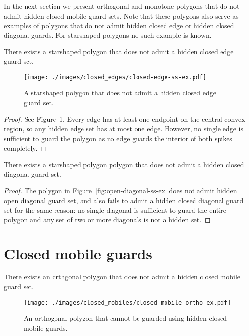 \documentclass{cccg12}
\begin{document}
In the next section we present orthogonal and monotone polygons that do not admit hidden closed mobile guard sets.
Note that these polygons also serve as examples of polygons that do not admit hidden closed edge or hidden closed diagonal guards.
For starshaped polygons no such example is known.

\begin{lemma}
There exists a starshaped polygon that does not admit a hidden closed edge guard set.
\end{lemma}

\begin{figure}[ht]
\centering
\texttt{[image: ./images/closed\_edges/closed-edge-ss-ex.pdf]}
\caption{A starshaped polygon that does not admit a hidden closed edge guard set.}
\label{fig:closed-edge-ss-ex}
\end{figure}

\begin{proof}
See Figure~\ref{fig:closed-edge-ss-ex}.
Every edge has at least one endpoint on the central convex region, so any hidden edge set has at most one edge.
However, no single edge is sufficient to guard the polygon as no edge guards the interior of both spikes completely.
\end{proof}

\begin{lemma}
There exists a starshaped polygon polygon that does not admit a hidden closed diagonal guard set.
\end{lemma}

\begin{proof}
The polygon in Figure~\ref{fig:open-diagonal-ss-ex} does not admit hidden open diagonal guard set, and also fails to admit a hidden closed diagonal guard set for the same reason: no single diagonal is sufficient to guard the entire polygon and any set of two or more diagonals is not a hidden set. 
\end{proof}

\section{Closed mobile guards}

\begin{lemma}
There exists an orthgonal polygon that does not admit a hidden closed mobile guard set.
\end{lemma}

\begin{figure}[ht]
\centering
\texttt{[image: ./images/closed\_mobiles/closed-mobile-ortho-ex.pdf]}
\caption{An orthogonal polygon that cannot be guarded using hidden closed mobile guards.}
\label{fig:closed-mobile-ortho-ex}
\end{figure}
\end{document}

